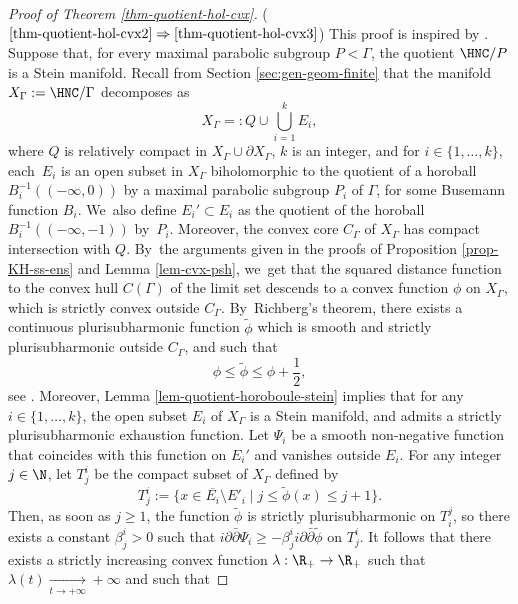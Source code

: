 \begin{proof}[Proof of Theorem \ref{thm-quotient-hol-cvx}]
($\eqref{thm-quotient-hol-cvx2}\Rightarrow\eqref{thm-quotient-hol-cvx3}$) This proof is inspired by \cite[Proof of Th.\,1.4]{chenDiscreteGroupsHolomorphic2013}. Suppose that, for every maximal parabolic subgroup $P<\Gamma$, the quotient $\HNC/P$ is a Stein manifold. Recall from Section \ref{sec:gen-geom-finite} that the manifold $X_{\Gamma}:=\HNC/\Gamma$ decomposes as
\begin{equation*}
X_{\Gamma} =: Q \cup \bigcup_{i=1}^{k}E_i,
\end{equation*}
where $Q$ is relatively compact in $X_{\Gamma} \cup \partial X_{\Gamma}$, $k$ is an integer, and for $i\in \{1,\dots,k\}$, each~$E_i$ is an open subset in $X_{\Gamma}$ biholomorphic to the quotient of a horoball $B_i^{-1}((-\infty,0))$ by a maximal parabolic subgroup $P_i$ of $\Gamma$, for some Busemann function $B_i$. We~also define $E_i'\subset E_i$ as the quotient of the horoball $B_i^{-1}((-\infty,-1))$ by~$P_i$. Moreover, the convex core $C_{\Gamma}$ of $X_{\Gamma}$ has compact intersection with $Q$. By~the arguments given in the proofs of Proposition \ref{prop-KH-ss-ens} and Lemma \ref{lem-cvx-psh}, we~get that the squared distance function to the convex hull $C(\Gamma)$ of the limit set descends to a convex function $\phi$ on $X_{\Gamma}$, which is strictly convex outside $C_{\Gamma}$. By~Richberg's theorem, there exists a continuous plurisubharmonic function $\widetilde{\phi}$ which is smooth and strictly plurisubharmonic outside $C_{\Gamma}$, and such that
\begin{equation*}
\phi \le \widetilde{\phi} \le \phi + \frac{1}{2},
\end{equation*}see \cite[Th.\,I.5.21]{demaillyComplexAnalyticDifferential-manuel}. Moreover, Lemma \ref{lem-quotient-horoboule-stein} implies that for any $i\in \{1,\dots,k\}$, the open subset $E_i$ of $X_{\Gamma}$ is a Stein manifold, and admits a strictly plurisubharmonic exhaustion function. Let $\Psi_i$ be a smooth non-negative function that coincides with this function on $E_i'$ and vanishes outside $E_i$. For any integer $j\in \N$, let $T^{i}_j$ be the compact subset of $X_{\Gamma}$ defined by
\begin{equation*}
T^{i}_j:= \{x\in \overline{E_i}\setminus E'_i \mid j\le \widetilde{\phi}(x) \le j+1\}.
\end{equation*}
Then, as soon as $j\ge1$, the function $\widetilde{\phi}$ is strictly plurisubharmonic on $T_i^{j}$, so there exists a constant $\beta^{i}_j>0$ such that $i\partial\bar{\partial} \Psi_i \ge -\beta^{i}_j i\partial\bar{\partial} \widetilde{\phi}$ on $T^{i}_j$. It follows that there exists a strictly increasing convex function $\lambda:\R_{+}\to\R_{+}$ such that $\lambda(t)\underset{t\to+\infty}{\longrightarrow}+\infty$ and such that

\end{proof}
